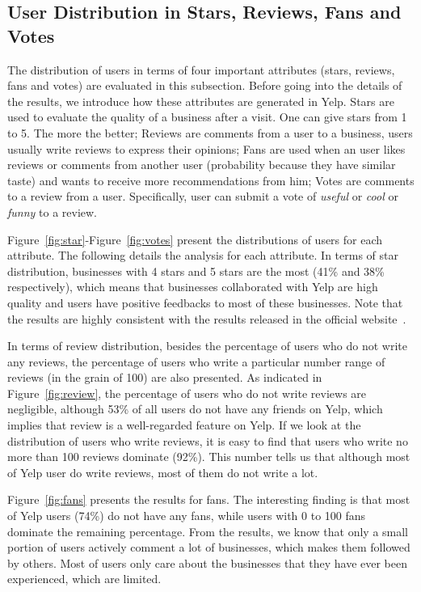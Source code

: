 \documentclass[11pt, oneside]{article}   	%
\begin{document}
\subsection{User Distribution in Stars, Reviews, Fans and Votes}
The distribution of users in terms of four important attributes (stars, reviews, fans and votes) 
are evaluated in this subsection. Before going into the details of the results, we introduce how these 
attributes are 
generated in Yelp.  Stars are used to evaluate the quality of a business after a visit. One can give stars from 1 to 5. 
The more the better; Reviews are comments from a user to a business, users usually write reviews to 
express their opinions; Fans are used when an user likes reviews or comments from another user 
(probability because they have similar taste)  and wants to receive more recommendations from him; 
Votes are comments to a review from a user. Specifically, user can submit a vote of \textit{useful} or 
\textit{cool} or \textit{funny} to a review.  

Figure~\ref{fig:star}-Figure~\ref{fig:votes} present the distributions of users for each attribute. The following details 
the analysis for each attribute. In terms of star distribution, businesses with 4 stars and 5 stars are the most
(41\% and 38\% respectively), which means that businesses collaborated with Yelp are high quality and users
have positive feedbacks to most of these businesses. Note that the results are highly consistent with the 
results released in the official website~\cite{yelpdata}. 

In terms of review distribution, besides the percentage of users who do not write any reviews, the percentage of 
users who write a particular number range of reviews (in the grain of 100) are also presented.  As indicated in 
Figure~\ref{fig:review}, the percentage of users who do not write reviews are negligible, although 53\% of all 
users do not have any friends on Yelp, which implies that review is a well-regarded feature on Yelp.  
If we look at the distribution of users who write reviews, it is easy to find that users who write no more than 
100 reviews dominate (92\%). This number tells us that although most of Yelp user do write reviews, 
most of them do not write a lot. 

Figure~\ref{fig:fans} presents the results for fans. The interesting finding is that most of Yelp users (74\%) 
do not have any fans, while users with 0 to 100 fans dominate the remaining percentage. From the results, 
we know that only a small portion of users actively comment a lot of businesses, which makes them followed 
by others. Most of users only care about the businesses that they have ever been experienced, which are limited.
 
\end{document}
